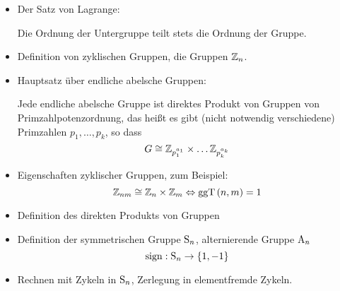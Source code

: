 \begin{itemize}
 \item Der Satz von Lagrange:
  \begin{satz}
   Die Ordnung der Untergruppe teilt stets die Ordnung der Gruppe.
  \end{satz}
 \item Definition von zyklischen Gruppen, die Gruppen $\mathbb{Z}_n$.
 \item Hauptsatz \"uber endliche abelsche Gruppen:
  \begin{satz}
  \label{hauptsatz_ueber_endliche_abelsche_gruppen}
   Jede endliche abelsche Gruppe ist direktes Produkt von Gruppen von Primzahlpotenzordnung, das hei\ss{}t es gibt (nicht notwendig verschiedene) Primzahlen $p_1, \ldots, p_k$, so dass
   \begin{equation*}
    G \cong \mathbb{Z}_{p_1^{a_1}} \times \ldots \mathbb{Z}_{p_k^{a_k}}
   \end{equation*}
  \end{satz}
 \item Eigenschaften zyklischer Gruppen, zum Beispiel:
  \begin{equation*}
   \mathbb{Z}_{nm} \cong \mathbb{Z}_n \times \mathbb{Z}_m \Leftrightarrow \operatorname{ggT}\left(n, m\right)=1
  \end{equation*}
 \item Definition des direkten Produkts von Gruppen
 \item Definition der symmetrischen Gruppe $\operatorname{S}_n$, alternierende Gruppe $\operatorname{A}_n$
  \begin{equation*}
   \operatorname{sign}: \operatorname{S}_n \to \left\{1, -1 \right\}
  \end{equation*}
 \item Rechnen mit Zykeln in $\operatorname{S}_n$, Zerlegung in elementfremde Zykeln.
\end{itemize}
